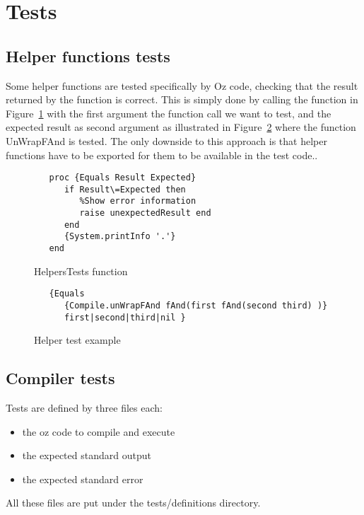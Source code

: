 \documentclass[a4paper]{memoir}
\begin{document}
\section{Tests}
\subsection{Helper functions tests}
Some helper functions are tested specifically by Oz code, checking that the result returned by the function is correct. This is simply done by calling the function in Figure~\ref{fig:helperstestsfunction} with the first argument the function call we want to test, and the expected result as second argument as illustrated in Figure~\ref{fig:helperstestsexample} where the function UnWrapFAnd is tested.
The only downside to this approach is that helper functions have to be exported for them to be available in the test code..

\begin{figure}
\begin{lstlisting}
   proc {Equals Result Expected}
      if Result\=Expected then
         %Show error information
         raise unexpectedResult end
      end
      {System.printInfo '.'}
   end
\end{lstlisting}
\label{fig:helperstestsfunction}
\caption{HelpersTests function}
\end{figure}

\begin{figure}
\begin{lstlisting}
   {Equals 
      {Compile.unWrapFAnd fAnd(first fAnd(second third) )}
      first|second|third|nil }
\end{lstlisting}
\caption{Helper test example}
\label{fig:helperstestsexample}
\end{figure}
\subsection{Compiler tests}
Tests are defined by three files each:
\begin{itemize}
  \item the oz code to compile and execute
  \item the expected standard output
  \item the expected standard error
\end{itemize}
All these files are put under the tests/definitions directory.
\end{document}
